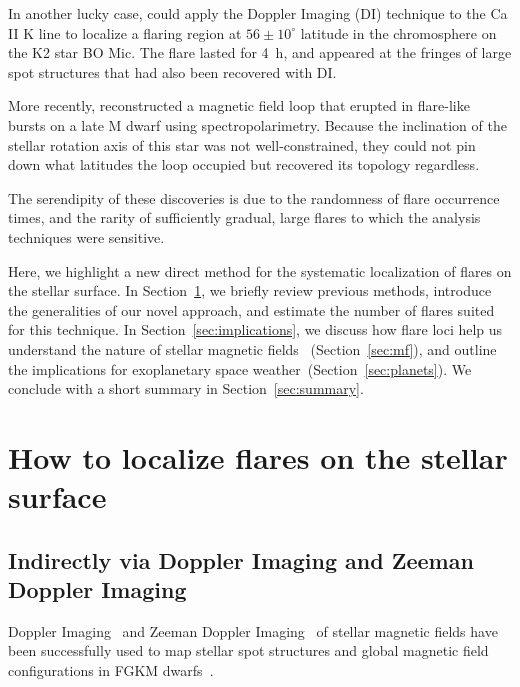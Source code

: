 \documentclass[proof]{WileyASNA-v1}
\newcommand{\jdag}[1]{\textcolor{darkred}{#1}}
\begin{document}
In another lucky case, \citet{wolter2008} could apply the Doppler Imaging (DI) technique to the Ca II K line to localize a flaring region at $56\pm10^\circ$ latitude in the chromosphere on the K2 star BO Mic. The flare lasted for 4~h, and appeared at the fringes of large spot structures that had also been recovered with DI.

More recently, \citet{berdyugina2017} reconstructed a magnetic field loop that erupted in flare-like bursts on a late M dwarf using spectropolarimetry. Because the inclination of the stellar rotation axis of this star was not well-constrained, they could not pin down what latitudes the loop occupied but recovered its topology regardless.

The serendipity of these discoveries is due to the randomness of flare occurrence times, and the rarity of sufficiently gradual, large flares to which the analysis techniques were sensitive. 

Here, we highlight a new direct method for the systematic localization of flares on the stellar surface. In Section~\ref{sec:howto}, we briefly review previous methods, introduce the generalities of our novel approach, and estimate the number of flares suited for this technique. In Section~\ref{sec:implications}, we discuss how flare loci help us understand the nature of stellar magnetic fields ~(Section~\ref{sec:mf}), and outline the implications for exoplanetary space weather~(Section~\ref{sec:planets}). We conclude with a short summary in Section~\ref{sec:summary}.

\section{How to localize flares on the stellar surface}
\label{sec:howto}

\subsection{Indirectly via Doppler Imaging and Zeeman Doppler Imaging }
Doppler Imaging~\citep[DI,][]{deutsch1958, goncharskii1977} and Zeeman Doppler Imaging~\citep[ZDI,][]{semel1989, donati1989} of stellar magnetic fields have been successfully used to map stellar spot structures and global magnetic field configurations in FGKM dwarfs~\citep{strassmeier2002,morin2008,morin2010,see2019}. %
\end{document}
